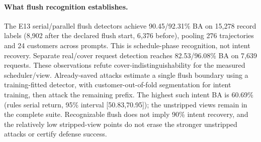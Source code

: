 \paragraph{What flush recognition establishes.}
The E13 serial/parallel flush detectors achieve 90.45/92.31\% BA on 15,278 record labels (8,902 after the declared flush start, 6,376 before), pooling 276 trajectories and 24 customers across prompts. This is schedule-phase recognition, not intent recovery. Separate real/cover request detection reaches 82.53/96.08\% BA on 7,639 requests. These observations refute cover-indistinguishability for the measured scheduler/view. Already-saved attacks estimate a single flush boundary using a training-fitted detector, with customer-out-of-fold segmentation for intent training, then attack the remaining prefix. The highest such intent BA is 60.69\% (rules serial return, 95\% interval [50.83,70.95]); the unstripped views remain in the complete suite. Recognizable flush does not imply 90\% intent recovery, and the relatively low stripped-view points do not erase the stronger unstripped attacks or certify defense success.

